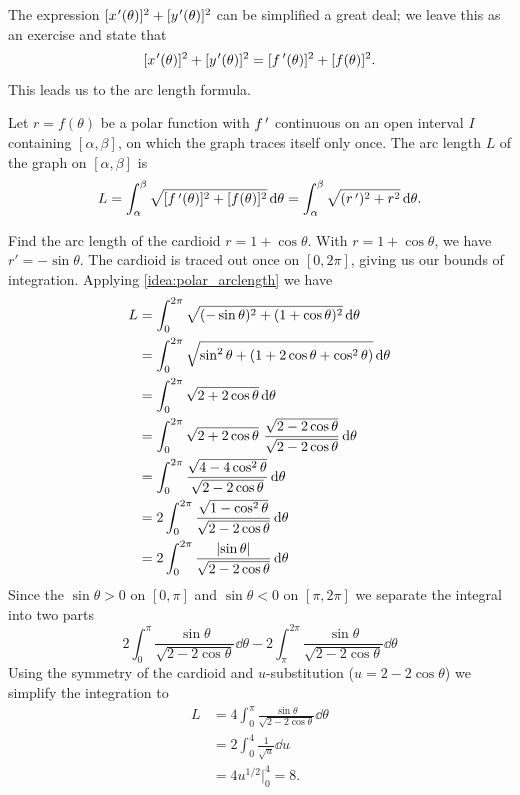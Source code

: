 The expression $[x\primeskip'(\theta)]^2+[y\primeskip'(\theta)]^2$ can be simplified a great deal; we leave this as an exercise and state that
\[
[x\primeskip'(\theta)]^2+[y\primeskip'(\theta)]^2 = [\fp(\theta)]^2+[f(\theta)]^2.
\]
This leads us to the  arc length formula.

\begin{keyidea}\label{idea:polar_arclength}%
Let  $r=f(\theta)$ be a polar function with $f\,'$ continuous on an open interval $I$ containing $[\alpha,\beta]$, on which the graph traces itself only once. The arc length $L$ of the graph on $[\alpha,\beta]$ is
\[L = \int_\alpha^\beta \sqrt{[f\,'(\theta)]^2+[f(\theta)]^2}\operatorname{d}\!\theta = \int_\alpha^\beta\sqrt{(r\,')^2+ r^2}\operatorname{d}\!\theta.\]
\end{keyidea}

\begin{example}\label{ex_cardioid_length}%
Find the arc length of the cardioid $r=1+\cos \theta$.
\solution
With $r=1+\cos \theta$, we have $r' = -\sin \theta$. The cardioid is traced out once on $[0,2\pi]$, giving us our bounds of integration. Applying \autoref{idea:polar_arclength} we have
\begin{align*}
	L
	& = \int_0^{2\pi} \sqrt{(-\sin \theta)^2  + (1 + \cos \theta)^2}\operatorname{d}\!\theta \\
	& = \int_0^{2\pi} \sqrt{\sin^2 \theta + (1 + 2\cos \theta + \cos^2 \theta)}\operatorname{d}\!\theta\\
	& = \int_0^{2\pi} \sqrt{2 + 2\cos \theta}\operatorname{d}\!\theta\\
	& = \int_0^{2\pi} \sqrt{2 + 2\cos \theta}\ \frac{\sqrt {2-2\cos \theta}}{\sqrt {2-2\cos \theta}}\operatorname{d}\!\theta\\
	& = \int_0^{2\pi} \frac{\sqrt{4 - 4\cos^2 \theta}}{\sqrt {2-2\cos \theta}}\operatorname{d}\!\theta\\
	& = 2\int_0^{2\pi} \frac{\sqrt{1 - \cos^2 \theta}}{\sqrt {2-2\cos \theta}}\operatorname{d}\!\theta\\
	& = 2\int_0^{2\pi} \frac{\left\lvert \sin\theta \right\rvert}{\sqrt {2-2\cos \theta}}\operatorname{d}\!\theta
\end{align*}
Since the $\sin \theta > 0$ on $[0, \pi]$ and $\sin \theta < 0$ on $[\pi, 2\pi]$ we separate the integral into two parts
\[
2\int_0^{\pi} \frac{\sin \theta}{\sqrt {2-2\cos \theta}}\dd\theta - 2\int_{\pi}^{2\pi} \frac{\sin \theta}{\sqrt {2-2\cos \theta}}\dd\theta
\]
Using the symmetry of the cardioid and $u$-substitution ($u = 2 - 2\cos \theta$) we simplify the integration to
\begin{align*}
L
& = 4\int_0^{\pi} \frac{\sin \theta}{\sqrt {2-2\cos \theta}}\dd\theta\\
& = 2\int_0^4 \frac{1}{\sqrt u}\dd u\\
& = 4  u^{1/2}\biggr|_0^4 = 8.
\end{align*}
\end{example}

